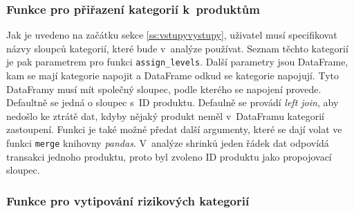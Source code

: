 

\subsubsection*{Funkce pro přiřazení kategorií k~produktům}

Jak je uvedeno na začátku sekce \ref*{ss:vstupyvystupy}, uživatel musí specifikovat názvy sloupců kategorií, které bude v~analýze používat. Seznam těchto kategorií je pak parametrem pro funkci \texttt{assign\_levels}. Další parametry jsou DataFrame, kam se mají kategorie napojit a DataFrame odkud se kategorie napojují. Tyto DataFramy musí mít společný sloupec, podle kterého se napojení provede. Defaultně se jedná o sloupec s~ID produktu. Defaulně se provádí \emph{left join}, aby nedošlo ke ztrátě dat, kdyby nějaký produkt neměl v~DataFramu kategorií zastoupení. Funkci je také možné předat další argumenty, které se dají volat ve funkci \texttt{merge} knihovny \emph{pandas}. V~analýze shrinků jeden řádek dat odpovídá transakci jednoho produktu, proto byl zvoleno ID produktu jako propojovací sloupec.

\subsubsection*{Funkce pro vytipování rizikových kategorií}

